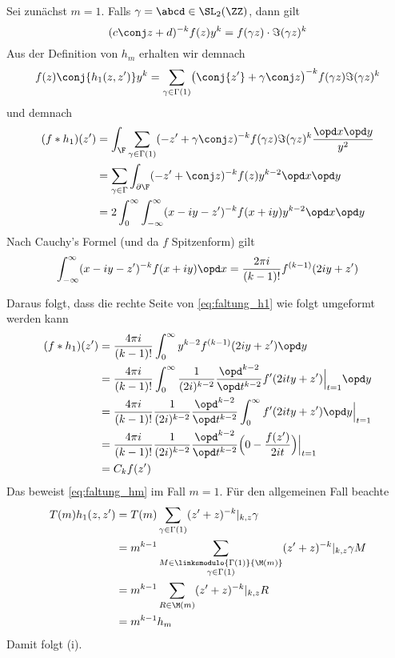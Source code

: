 \begin{bewe}
	Sei zunächst $m=1$.
	Falls $\gamma = \abcd \in \SL_2(\ZZ)$, dann gilt
	\[
		(c\conj z + d)^{-k} f(z) y^k = f(\gamma z) \cdot \Im (\gamma z)^k
	\]
	Aus der Definition von $h_m$ erhalten wir demnach
	\[
		f(z)\conj{h_1(z, z')} y^k
		= \sum_{\gamma \in \Gamma(1)} \bigl(\conj{z'} + \gamma \conj z\bigr)^{-k} f(\gamma z) \Im(\gamma z)^k
	\]
	und demnach
	\begin{equation}\label{eq:faltung_h1}%
	\begin{split}
		(f * h_1)(z') &= \int_\F \sum_{\gamma \in \Gamma(1)} (-z' + \gamma \conj z)^{-k} f(\gamma z) \Im(\gamma z)^k \frac{\opd x \opd y}{y^2} \\
		&= \sum_{\gamma \in \Gamma} \int_{\partial \F} (-z' + \conj z)^{-k} f(z) y^{k-2} \opd x \opd y \\
		&= 2 \int_0^\infty \int_{-\infty}^\infty (x-iy - z')^{-k} f(x+iy) y^{k-2} \opd x \opd y
		\end{split}
	\end{equation}
	Nach Cauchy's Formel (und da $f$ Spitzenform) gilt
	\[
		\int_{-\infty}^\infty (x-iy - z')^{-k} f(x+iy) \opd x
		= \frac{2\pi i}{(k-1)!} f^{(k-1)} (2iy + z')
	\]
	
	Daraus folgt, dass die rechte Seite von \eqref{eq:faltung_h1} wie folgt umgeformt werden kann
	\begin{equation*}
	\begin{split}
		(f * h_1)(z') &= \frac{4\pi i}{(k-1)!} \int_0^\infty y^{k-2} f^{(k-1)} (2iy + z') \opd y \\
		&= \frac{4\pi i}{(k-1)!} \int_0^\infty \frac{1}{(2i)^{k-2}} \frac{\opd^{k-2}}{\opd t^{k-2}} f'(2ity + z') \Big|_{t=1} \opd y \\
		&= \frac{4\pi i}{(k-1)!} \frac{1}{(2i)^{k-2}} \frac{\opd^{k-2}}{\opd t^{k-2}} \int_0^\infty f'(2i ty + z') \opd y \Big|_{t=1} \\
		&= \frac{4\pi i}{(k-1)!} \frac{1}{(2i)^{k-2}} \frac{\opd^{k-2}}{\opd t^{k-2}} \Bigl( 0 - \frac{f(z')}{2it}\Bigr) \Big|_{t=1} \\
		&= C_k f(z')
	\end{split}
	\end{equation*}
	Das beweist \eqref{eq:faltung_hm} im Fall $m=1$.
	Für den allgemeinen Fall beachte
	\[
	\begin{split}
		T(m)h_1(z,z')
		&= T(m) \sum_{\gamma\in\Gamma(1)} (z'+z)^{-k} |_{k,z} \gamma \\
		&= m^{k-1} \sum_{\substack{M \in \linksmodulo{\Gamma(1)}{\M(m)}\\ \gamma \in \Gamma(1)}} (z'+z)^{-k} |_{k,z} \gamma M \\
		&= m^{k-1} \sum_{R \in \M(m)} (z'+z)^{-k}|_{k,z} R \\
		&= m^{k-1} h_m
	\end{split}
	\]
	Damit folgt (i).
	

\end{bewe}
